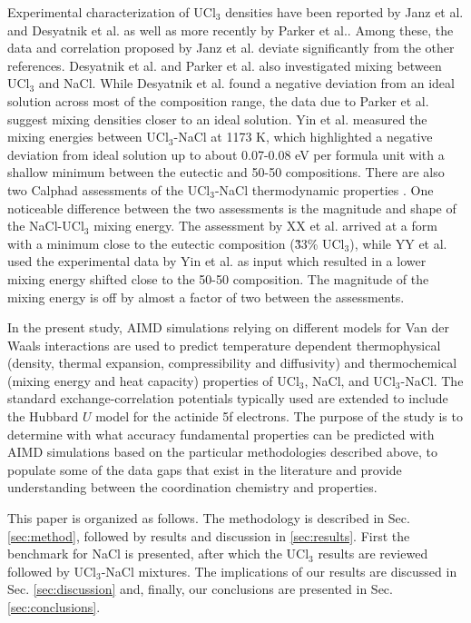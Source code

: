 \documentclass[preprint,3p,10pt,twocolumn,number,sort&compress]{elsarticle}
\begin{document}
Experimental characterization of UCl$_3$ densities have been reported by Janz et al. \cite{} and Desyatnik et al. \cite{} as well as more recently by Parker et al.\cite{}. Among these, the data and correlation proposed by Janz et al. deviate significantly from the other references. Desyatnik et al. and Parker et al. also investigated mixing between UCl$_3$ and NaCl. While Desyatnik et al. found a negative deviation from an ideal solution across most of the composition range, the data due to Parker et al. suggest mixing densities closer to an ideal solution. Yin et al. \cite{} measured the mixing energies between UCl$_{3}$-NaCl at 1173 K, which highlighted a negative deviation from ideal solution up to about 0.07-0.08 eV per formula unit with a shallow minimum between the eutectic and 50-50 compositions. There are also two Calphad assessments of the UCl$_3$-NaCl thermodynamic properties \cite{}. One noticeable difference between the two assessments is the magnitude and shape of the NaCl-UCl$_3$ mixing energy. The assessment by XX et al. arrived at a form with a minimum close to the eutectic composition (\~33\% UCl$_3$), while YY et al. used the experimental data by Yin et al. as input which resulted in a lower mixing energy shifted close to the 50-50 composition. The magnitude of the mixing energy is off by almost a factor of two between the assessments. 
 
In the present study, AIMD simulations relying on different models for Van der Waals interactions are used to predict temperature dependent thermophysical (density, thermal expansion, compressibility and diffusivity) and thermochemical (mixing energy and heat capacity) properties of UCl$_3$, NaCl, and UCl$_3$-NaCl. The standard exchange-correlation potentials typically used are extended to include the Hubbard $U$  model for the actinide 5f electrons. The purpose of the study is to determine with what accuracy fundamental properties can be predicted with AIMD simulations based on the particular methodologies described above, to populate some of the data gaps that exist in the literature and provide understanding between the coordination chemistry and properties. 

This paper is organized as follows. The methodology is described in Sec. \ref{sec:method}, followed by results and discussion in \ref{sec:results}. First the benchmark for NaCl is presented, after which the UCl$_3$ results are reviewed followed by UCl$_3$-NaCl mixtures. The implications of our results are discussed in Sec. \ref{sec:discussion} and, finally, our conclusions are presented in Sec. \ref{sec:conclusions}. 
\end{document}
